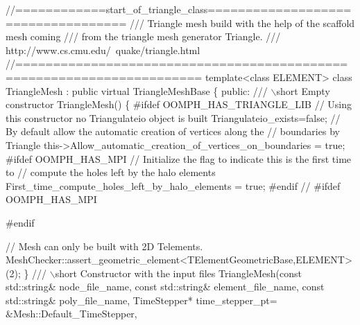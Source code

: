  
\begin{DoxyCodeInclude}
\textcolor{comment}{//============start\_of\_triangle\_class===================================}
\textcolor{comment}{/// Triangle mesh build with the help of the scaffold mesh coming  }
\textcolor{comment}{}\textcolor{comment}{/// from the triangle mesh generator Triangle.}
\textcolor{comment}{}\textcolor{comment}{/// http://www.cs.cmu.edu/~quake/triangle.html}
\textcolor{comment}{}\textcolor{comment}{//======================================================================}
 \textcolor{keyword}{template}<\textcolor{keyword}{class} ELEMENT>
 \textcolor{keyword}{class }TriangleMesh : \textcolor{keyword}{public} \textcolor{keyword}{virtual} TriangleMeshBase
 \{
 \textcolor{keyword}{public}:
  \textcolor{comment}{}
\textcolor{comment}{  /// \(\backslash\)short Empty constructor }
\textcolor{comment}{}  TriangleMesh()
   \{
\textcolor{preprocessor}{#ifdef OOMPH\_HAS\_TRIANGLE\_LIB  }
    \textcolor{comment}{// Using this constructor no Triangulateio object is built}
    Triangulateio\_exists=\textcolor{keyword}{false};
    \textcolor{comment}{// By default allow the automatic creation of vertices along the}
    \textcolor{comment}{// boundaries by Triangle}
    this->Allow\_automatic\_creation\_of\_vertices\_on\_boundaries = \textcolor{keyword}{true};
\textcolor{preprocessor}{#ifdef OOMPH\_HAS\_MPI}
    \textcolor{comment}{// Initialize the flag to indicate this is the first time to}
    \textcolor{comment}{// compute the holes left by the halo elements}
    First\_time\_compute\_holes\_left\_by\_halo\_elements = \textcolor{keyword}{true};
\textcolor{preprocessor}{#endif // #ifdef OOMPH\_HAS\_MPI}

\textcolor{preprocessor}{#endif}

    \textcolor{comment}{// Mesh can only be built with 2D Telements.}
    MeshChecker::assert\_geometric\_element<TElementGeometricBase,ELEMENT>(2);
   \}
  \textcolor{comment}{}
\textcolor{comment}{  /// \(\backslash\)short Constructor with the input files}
\textcolor{comment}{}  TriangleMesh(\textcolor{keyword}{const} std::string& node\_file\_name,
               \textcolor{keyword}{const} std::string& element\_file\_name,
               \textcolor{keyword}{const} std::string& poly\_file\_name,
               TimeStepper* time\_stepper\_pt=
               &Mesh::Default\_TimeStepper,

\end{DoxyCodeInclude}





